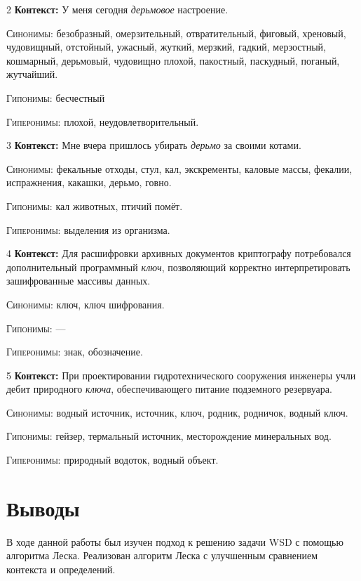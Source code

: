\documentclass[a4paper, 12pt]{article}
\begin{document}
\begin{lexbox}{2}
  \noindent\textbf{Контекст:} У меня сегодня \emph{дерьмовое} настроение.

  \medskip
  \noindent\textsc{Синонимы:} безобразный, омерзительный, отвратительный, фиговый, хреновый, чудовищный, отстойный, ужасный, жуткий, мерзкий, гадкий, мерзостный, кошмарный, дерьмовый, чудовищно плохой, пакостный, паскудный, поганый, жутчайший.

  \noindent\textsc{Гипонимы:} бесчестный

  \noindent\textsc{Гиперонимы:} плохой, неудовлетворительный.
\end{lexbox}

\begin{lexbox}{3}
  \noindent\textbf{Контекст:} Мне вчера пришлось убирать \emph{дерьмо} за своими котами.

  \medskip
  \noindent\textsc{Синонимы:} фекальные отходы, стул, кал, экскременты, каловые массы, фекалии, испражнения, какашки, дерьмо, говно.

  \noindent\textsc{Гипонимы:} кал животных, птичий помёт.

  \noindent\textsc{Гиперонимы:} выделения из организма.
\end{lexbox}

\begin{lexbox}{4}
  \noindent\textbf{Контекст:} Для расшифровки архивных документов криптографу потребовался дополнительный программный \emph{ключ}, позволяющий корректно интерпретировать зашифрованные массивы данных.

  \medskip
  \noindent\textsc{Синонимы:} ключ, ключ шифрования.

  \noindent\textsc{Гипонимы:} ---

  \noindent\textsc{Гиперонимы:} знак, обозначение.
\end{lexbox}

\begin{lexbox}{5}
  \noindent\textbf{Контекст:} При проектировании гидротехнического сооружения инженеры учли дебит природного \emph{ключа}, обеспечивающего питание подземного резервуара.

  \medskip
  \noindent\textsc{Синонимы:} водный источник, источник, ключ, родник, родничок, водный ключ.

  \noindent\textsc{Гипонимы:} гейзер, термальный источник, месторождение минеральных вод.

  \noindent\textsc{Гиперонимы:} природный водоток, водный объект.
\end{lexbox}


\section{Выводы}
В ходе данной работы был изучен подход к решению задачи WSD с помощью алгоритма Леска. Реализован алгоритм Леска с улучшенным сравнением контекста и определений.
\end{document}
